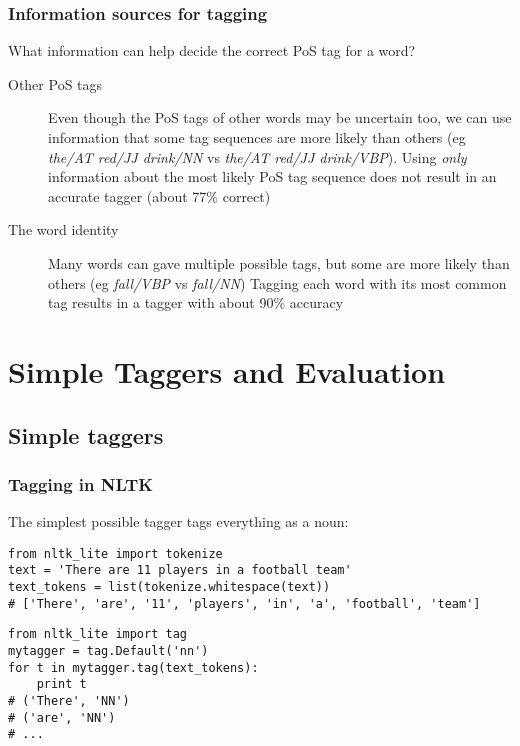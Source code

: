 \documentclass{beamer}
\begin{document}

\begin{frame}
  \frametitle{Information sources for tagging}

  What information can help decide the correct PoS tag for a word?
  \begin{description}
  \item[Other PoS tags] Even though the PoS tags of other words may be
    uncertain too, we can use information that some tag sequences are
    more likely than others (eg \emph{the/AT red/JJ drink/NN} vs \emph{the/AT
      red/JJ drink/VBP}).\newline
    Using \emph{only} information about the most likely PoS tag
    sequence does not result in an accurate tagger (about 77\%
    correct)
  \item[The word identity] Many words can gave multiple possible tags,
    but some are more likely than others (eg \emph{fall/VBP} vs
    \emph{fall/NN}) \newline
    Tagging each word with its most common tag results in a tagger
    with about 90\% accuracy
  \end{description}
\end{frame}



\section{Simple Taggers and Evaluation}

\subsection{Simple taggers} 

\begin{frame}[fragile]
  \frametitle{Tagging in NLTK}
The simplest possible tagger tags everything as a noun:
{\small
\begin{verbatim}
from nltk_lite import tokenize
text = 'There are 11 players in a football team'
text_tokens = list(tokenize.whitespace(text))
# ['There', 'are', '11', 'players', 'in', 'a', 'football', 'team']
\end{verbatim}
  \pause
\begin{verbatim}
from nltk_lite import tag
mytagger = tag.Default('nn')
for t in mytagger.tag(text_tokens):
    print t
# ('There', 'NN')
# ('are', 'NN')
# ...
\end{verbatim}}
\end{frame}
\end{document}
